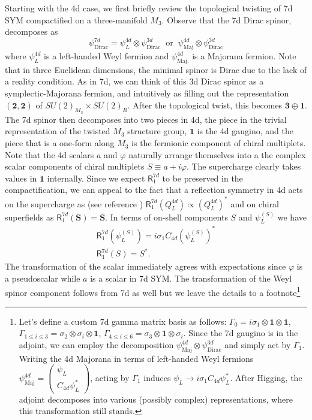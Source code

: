 \documentclass[12pt]{article}%
\numberwithin{equation}{section}
\renewcommand{\(}{\left(}
\renewcommand{\)}{\right)}
\renewcommand{\[}{\left[}
\renewcommand{\]}{\right]}
\begin{document}
Starting with the 4d case, we first briefly review the topological twisting of 7d SYM compactified on a three-manifold $M_3$. Observe that the 7d Dirac spinor, decomposes as
\begin{equation}
\psi^{7d}_{\mathrm{Dirac}}=\psi^{4d}_{L}\otimes \psi^{3d}_{\mathrm{Dirac}} \; \; \mathrm{or} \; \; \psi^{4d}_{\mathrm{Maj}}\otimes \psi^{3d}_{\mathrm{Dirac}}
\end{equation}
where $\psi^{4d}_{L}$ is a left-handed Weyl fermion and $\psi^{4d}_{\mathrm{Maj.}}$ is a Majorana fermion. Note that in three Euclidean dimensions, the minimal spinor is Dirac due to the lack of a reality condition. As in 7d, we can think of this 3d Dirac spinor as a symplectic-Majorana fermion, and intuitively as filling out the representation $(\mathbf{2},\mathbf{2})$ of $SU(2)_{M_3}\times SU(2)_R$. After the topological twist, this becomes $\mathbf{3}\oplus \mathbf{1}$. The 7d spinor then decomposes into two pieces in 4d, the piece in the trivial representation of the twisted $M_3$ structure group, $\mathbf{1}$ is the 4d gaugino, and the piece that is a one-form along $M_3$ is the fermionic component of chiral multiplets. Note that the 4d scalars $a$ and $\varphi$ naturally arrange themselves into a the complex scalar components of chiral multiplets $S \equiv a+i\varphi$. The supercharge clearly takes values in $\mathbf{1}$ internally. Since we expect $\mathsf{R}^{7d}_1$ to be preserved in the compactification, we can appeal to the fact that  a reflection symmetry in 4d acts on the supercharge as (see reference \cite{Weinberg:2000cr})
$\mathsf{R}^{7d}_1 (Q^{4d}_L) \propto (Q^{4d}_L)^*$ and on chiral superfields as $\mathsf{R}^{7d}_1 (\boldsymbol{S})=\overline{\boldsymbol{S}}$. In terms of on-shell components $S$ and $\psi^{(S)}_L$ we have
\begin{align}
\mathsf{R}^{7d}_1(\psi^{(S)}_L)=i\sigma_1 C_{4d} (\psi^{(S)}_L)^* \\
\mathsf{R}^{7d}_1(S)=S^*.
\end{align}
The transformation of the scalar immediately agrees with expectations since $\varphi$ is a pseudoscalar while $a$ is a scalar in 7d SYM. The transformation of the Weyl spinor component follows from 7d as well but we leave the details to a footnote\footnote{Let's define a custom 7d gamma matrix basis as follows: $\Gamma_0=i\sigma_1\otimes \mathbf{1}\otimes \mathbf{1}$, $\Gamma_{1\leq i \leq 3}=\sigma_2\otimes \sigma_i\otimes \mathbf{1}$, $\Gamma_{4\leq i \leq 6}=\sigma_3\otimes \mathbf{1}\otimes \sigma_i$. Since the 7d gaugino is in the adjoint, we can employ the decomposition $\psi^{4d}_{\mathrm{Maj}}\otimes \psi^{3d}_{\mathrm{Dirac}}$ and simply act by $\Gamma_1$. Writing the 4d Majorana in terms of left-handed Weyl fermions $\psi^{4d}_{\mathrm{Maj}}=\begin{pmatrix}
           \psi_L \\
           C_{4d}\psi^*_L
        \end{pmatrix}$, acting by $\Gamma_1$ induces $\psi_L\rightarrow i\sigma_1 C_{4d}\psi^*_L$. After Higging, the adjoint decomposes into various (possibly complex) representations, where this transformation still stands. }
\end{document}
